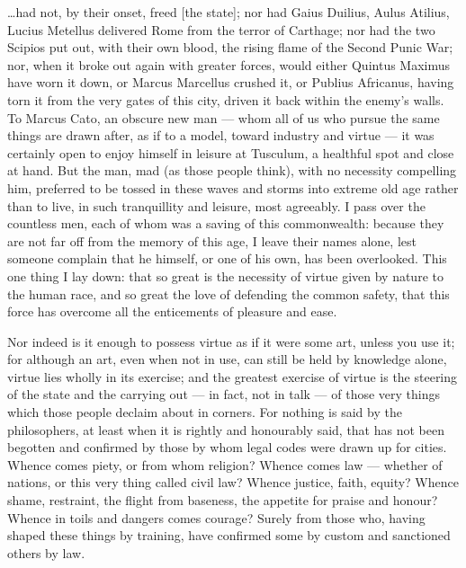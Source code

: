 

 \ldots had not, by their onset, freed [the state]; nor had Gaius Duilius, Aulus Atilius, Lucius Metellus delivered Rome from the terror of Carthage; nor had the two Scipios put out, with their own blood, the rising flame of the Second Punic War; nor, when it broke out again with greater forces, would either Quintus Maximus have worn it down, or Marcus Marcellus crushed it, or Publius Africanus, having torn it from the very gates of this city, driven it back within the enemy's walls. To Marcus Cato, an obscure new man --- whom all of us who pursue the same things are drawn after, as if to a model, toward industry and virtue --- it was certainly open to enjoy himself in leisure at Tusculum, a healthful spot and close at hand. But the man, mad (as those people think), with no necessity compelling him, preferred to be tossed in these waves and storms into extreme old age rather than to live, in such tranquillity and leisure, most agreeably. I pass over the countless men, each of whom was a saving of this commonwealth: because they are not far off from the memory of this age, I leave their names alone, lest someone complain that he himself, or one of his own, has been overlooked. This one thing I lay down: that so great is the necessity of virtue given by nature to the human race, and so great the love of defending the common safety, that this force has overcome all the enticements of pleasure and ease.

 Nor indeed is it enough to possess virtue as if it were some art, unless you use it; for although an art, even when not in use, can still be held by knowledge alone, virtue lies wholly in its exercise; and the greatest exercise of virtue is the steering of the state and the carrying out --- in fact, not in talk --- of those very things which those people declaim about in corners. For nothing is said by the philosophers, at least when it is rightly and honourably said, that has not been begotten and confirmed by those by whom legal codes were drawn up for cities. Whence comes piety, or from whom religion? Whence comes law --- whether of nations, or this very thing called civil law? Whence justice, faith, equity? Whence shame, restraint, the flight from baseness, the appetite for praise and honour? Whence in toils and dangers comes courage? Surely from those who, having shaped these things by training, have confirmed some by custom and sanctioned others by law.


